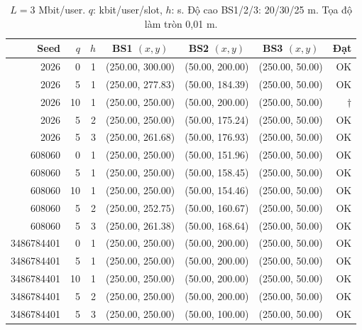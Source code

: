 \begin{table}
\centering
\renewcommand{\arraystretch}{1.16}
\setlength{\tabcolsep}{5pt}
\begin{tabular}{rrrcccr}
\toprule
Seed & $q$ & $h$ & BS1 $(x,y)$ & BS2 $(x,y)$ & BS3 $(x,y)$ & Đạt \\
\midrule
2026 & 0 & 1 & (250.00, 300.00) & (50.00, 200.00) & (250.00, 50.00) & OK \\
2026 & 5 & 1 & (250.00, 277.83) & (50.00, 184.39) & (250.00, 50.00) & OK \\
2026 & 10 & 1 & (250.00, 250.00) & (50.00, 200.00) & (250.00, 50.00) & $\dagger$ \\
2026 & 5 & 2 & (250.00, 250.00) & (50.00, 175.24) & (250.00, 50.00) & OK \\
2026 & 5 & 3 & (250.00, 261.68) & (50.00, 176.93) & (250.00, 50.00) & OK \\
608060 & 0 & 1 & (250.00, 250.00) & (50.00, 151.96) & (250.00, 50.00) & OK \\
608060 & 5 & 1 & (250.00, 250.00) & (50.00, 158.45) & (250.00, 50.00) & OK \\
608060 & 10 & 1 & (250.00, 250.00) & (50.00, 154.46) & (250.00, 50.00) & OK \\
608060 & 5 & 2 & (250.00, 252.75) & (50.00, 160.67) & (250.00, 50.00) & OK \\
608060 & 5 & 3 & (250.00, 261.38) & (50.00, 168.64) & (250.00, 50.00) & OK \\
3486784401 & 0 & 1 & (250.00, 250.00) & (50.00, 200.00) & (250.00, 50.00) & OK \\
3486784401 & 5 & 1 & (250.00, 250.00) & (50.00, 200.00) & (250.00, 50.00) & OK \\
3486784401 & 10 & 1 & (250.00, 250.00) & (50.00, 200.00) & (250.00, 50.00) & OK \\
3486784401 & 5 & 2 & (250.00, 250.00) & (50.00, 200.00) & (250.00, 50.00) & OK \\
3486784401 & 5 & 3 & (250.00, 250.00) & (50.00, 100.00) & (250.00, 50.00) & OK \\
\bottomrule
\end{tabular}
\caption{$L=3$ Mbit/user. $q$: kbit/user/slot, $h$: s. Độ cao BS1/2/3: 20/30/25 m. Tọa độ làm tròn 0,01 m.}
\end{table}
